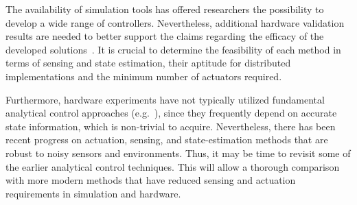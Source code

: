 
The availability of simulation tools has offered researchers the
possibility to develop a wide range of controllers.  Nevertheless,
additional hardware validation results are needed to better support
the claims regarding the efficacy of the developed
solutions~\cite{Mirletz2015, Caluwaerts2013rsif}.  It is crucial to
determine the feasibility of each method in terms of sensing and state
estimation, their aptitude for distributed implementations and the
minimum number of actuators required.

Furthermore, hardware experiments have not typically utilized
fundamental analytical control approaches (e.g.~\cite{sultan2002}),
since they frequently depend on accurate state information, which is
non-trivial to acquire.  Nevertheless, there has been recent progress
on actuation, sensing, and state-estimation methods that are robust to
noisy sensors and environments.  Thus, it may be time to revisit some
of the earlier analytical control techniques. This will allow a
thorough comparison with more modern methods that have reduced sensing
and actuation requirements in simulation and hardware.




